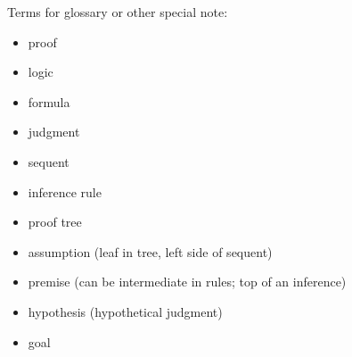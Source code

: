 \documentclass[conference]{IEEEtran}
\begin{document}
Terms for glossary or other special note:

\begin{itemize}
    \item proof
    \item logic
    \item formula
    \item judgment
    \item sequent
    \item inference rule
    \item proof tree
    \item assumption (leaf in tree, left side of sequent)
    \item premise (can be intermediate in rules; top of an inference)
    \item hypothesis (hypothetical judgment)
    \item goal
\end{itemize}



\end{document}
